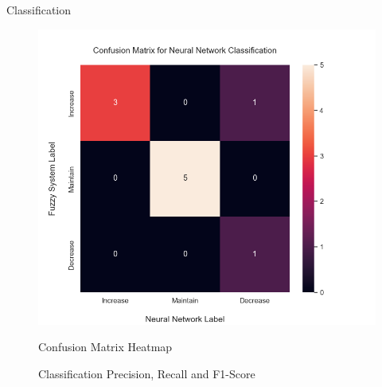 \documentclass[titlepage]{article}
\begin{document}
Classification

\begin{figure}[H]
    \centering
    \begin{minipage}{0.55\textwidth}
    \includegraphics[width=\textwidth]{../images/final_results/conf_matrix}
    \caption{Confusion Matrix Heatmap}
    \label{fig:conf_matrix_final}
    \end{minipage}
    \hfill
    \begin{minipage}{0.4\textwidth}
        \begin{table}[H]
            \centering
            \caption{Classification Precision, Recall and F1-Score}
            \label{tab:scores_final}
            
        \end{table}
    \end{minipage}
\end{figure}
\end{document}
